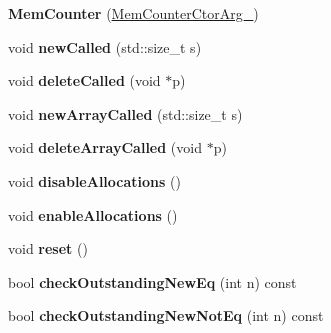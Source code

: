 \begin{DoxyCompactItemize}
\item 
\mbox{\label{class_mem_counter_a20b00197db6109d2154e1448f019a80b}} 
{\bfseries Mem\+Counter} (\mbox{\hyperlink{class_mem_counter_1_1_mem_counter_ctor_arg__}{Mem\+Counter\+Ctor\+Arg\+\_\+}})
\item 
\mbox{\label{class_mem_counter_a429f3173c44ba168a2bf71d4d2c82123}} 
void {\bfseries new\+Called} (std\+::size\+\_\+t s)
\item 
\mbox{\label{class_mem_counter_ab226627805ba6f5daea289e8d17fef5c}} 
void {\bfseries delete\+Called} (void $\ast$p)
\item 
\mbox{\label{class_mem_counter_a5e9519d2f5e4cb7e71d92a2e9f0abb9c}} 
void {\bfseries new\+Array\+Called} (std\+::size\+\_\+t s)
\item 
\mbox{\label{class_mem_counter_a4f6c121721ea845911626e5ece0bbaa2}} 
void {\bfseries delete\+Array\+Called} (void $\ast$p)
\item 
\mbox{\label{class_mem_counter_a0fd08c566bfb1fd279926d8fdcfead95}} 
void {\bfseries disable\+Allocations} ()
\item 
\mbox{\label{class_mem_counter_aa03dc1148cd5c47e3c892a45906788b8}} 
void {\bfseries enable\+Allocations} ()
\item 
\mbox{\label{class_mem_counter_a0d235dffd50648ca0cb1a142315c6be2}} 
void {\bfseries reset} ()
\item 
\mbox{\label{class_mem_counter_a68655de012910b8fac7b2bd1e2056d34}} 
bool {\bfseries check\+Outstanding\+New\+Eq} (int n) const
\item 
\mbox{\label{class_mem_counter_afb4ccf8b4c2fed7f79ca6e50205833a9}} 
bool {\bfseries check\+Outstanding\+New\+Not\+Eq} (int n) const
\item 
\mbox{\label{class_mem_counter_ad8e88efc8128d0056f4adfa018cdecc1}} 

\end{DoxyCompactItemize}
